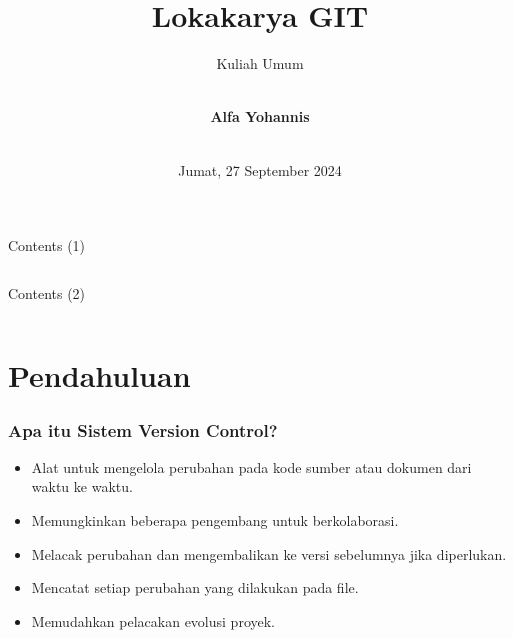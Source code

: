\documentclass[aspectratio=169, table]{beamer}
\subtitle{Kuliah Umum}
\title{\LARGE{Lokakarya GIT}\\\vspace{10pt}}
\date[Serial]{\\\vspace{10pt}\scriptsize {Jumat, 27 September 2024}}
\author[Pradita]{\\\vspace{20pt}\small{\textbf{Alfa Yohannis}}}
\begin{document}
\frame{\titlepage}

\begin{frame}[fragile]{Contents (1)}
\vspace{15pt}
\begin{columns}[t]
\begin{column}{.5\textwidth}
\tableofcontents[sections={1-6}]
\end{column}
\begin{column}{.5\textwidth}
\tableofcontents[sections={7-15}]
\end{column}
\end{columns}
\end{frame}

\begin{frame}[fragile]{Contents (2)}
	\vspace{15pt}
	\begin{columns}[t]
		\begin{column}{.5\textwidth}
			\tableofcontents[sections={16-24}]
		\end{column}
		\begin{column}{.5\textwidth}
			\tableofcontents[sections={25-50}]
		\end{column}
	\end{columns}
\end{frame}
\section{Pendahuluan}

\begin{frame}[fragile]
\frametitle{Apa itu Sistem Version Control?}
\begin{itemize}
\item Alat untuk mengelola perubahan pada kode sumber atau dokumen dari waktu ke waktu.
\item Memungkinkan beberapa pengembang untuk berkolaborasi.
\item Melacak perubahan dan mengembalikan ke versi sebelumnya jika diperlukan.
\item Mencatat setiap perubahan yang dilakukan pada file.
\item Memudahkan pelacakan evolusi proyek.
\end{itemize}
\end{frame}
\end{document}
